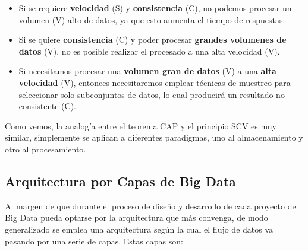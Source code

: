 \begin{itemize}
	\item Si se requiere \textbf{velocidad} (S) y \textbf{consistencia} (C), no podemos procesar un volumen (V) alto de datos, ya que esto aumenta el tiempo de respuestas.
	\item Si se quiere \textbf{consistencia} (C) y poder procesar \textbf{grandes volumenes de datos} (V), no es posible realizar el procesado a una alta velocidad (V).
	\item Si necesitamos procesar una \textbf{volumen gran de datos} (V) a una \textbf{alta velocidad} (V), entonces necesitaremos emplear técnicas de muestreo para seleccionar solo subconjuntos de datos, lo cual producirá un resultado no consistente (C). 
\end{itemize}

Como vemos, la analogía entre el teorema CAP y el principio SCV es muy similar, simplemente se aplican a diferentes paradigmas, uno al almacenamiento y otro al procesamiento.

\subsection{Arquitectura por Capas de Big Data}
Al margen de que durante el proceso de diseño y desarrollo de cada proyecto de Big Data pueda optarse por la arquitectura que más convenga, de modo generalizado se emplea una arquitectura según la cual el flujo de datos va pasando por una serie de capas. Estas capas son:

